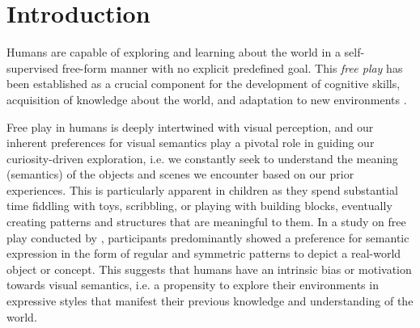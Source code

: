 \chapter{Introduction}
\label{sec:introduction}

Humans are capable of exploring and learning about the world in a self-supervised free-form manner with no explicit predefined goal.
This \emph{free play} has been established as a crucial component for the development of cognitive skills, acquisition of knowledge about the world, and adaptation to new environments \citep{exploration,chu2020play}.



Free play in humans is deeply intertwined with visual perception, and our inherent preferences for visual semantics play a pivotal role in guiding our curiosity-driven exploration, i.e. we constantly seek to understand the meaning (semantics) of the objects and scenes we encounter based on our prior experiences.
This is particularly apparent in children as they spend substantial time fiddling with toys, scribbling, or playing with building blocks, eventually creating patterns and structures that are meaningful to them.
In a study on free play conducted by \citet{diggs}, participants predominantly showed a preference for semantic expression in the form of regular and symmetric patterns to depict a real-world object or concept.
This suggests that humans have an intrinsic bias or motivation towards visual semantics, i.e. a propensity to explore their environments in expressive styles that manifest their previous knowledge and understanding of the world.

